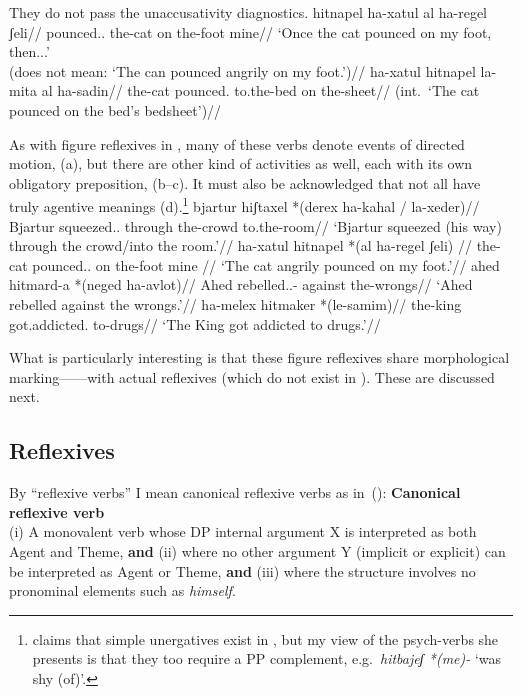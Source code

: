 They do not pass the unaccusativity diagnostics.
\ex \ljudge{\#} \begingl
		\gla hitnapel ha-xatul al ha-regel ʃeli//
		\glb pounced.. the-cat on the-foot mine//
		\glft `Once the cat pounced on my foot, then...'\\
			(does not mean: `The can pounced angrily on my foot.')//
	\endgl
\xe
\ex \ljudge{*} \begingl
	\gla ha-xatul hitnapel la-mita al ha-sadin//
	\glb the-cat pounced. to.the-bed on the-sheet//
	\glft (int.~`The cat pounced on the bed's bedsheet')//
	\endgl
\xe

As with figure reflexives in {\tnif}, many of these verbs denote events of directed motion, (\nextx a), but there are other kind of activities as well, each with its own obligatory preposition, (\nextx b--c). It must also be acknowledged that not all have truly agentive meanings (\nextx d).\footnote{\cite{siloni08} claims that simple unergatives exist in {\thit}, but my view of the psych-verbs she presents is that they too require a PP complement, e.g.~\emph{hitbajeʃ *(me)-} `was shy (of)'.}
\pex
	\a \begingl
		\gla bjartur hiʃtaxel *(derex ha-kahal / la-xeder)//
		\glb Bjartur squeezed.. through the-crowd {} to.the-room//
		\glft `Bjartur squeezed (his way) through the crowd/into the room.'//
		\endgl
	\a \begingl
		\gla ha-xatul hitnapel *(al ha-regel ʃeli) //
		\glb the-cat pounced.. on the-foot mine //
		\glft `The cat angrily pounced on my foot.'//
		\endgl
	\a \begingl
		\gla ahed hitmard-a *(neged ha-avlot)//
		\glb Ahed rebelled..- against the-wrongs//
		\glft `Ahed rebelled against the wrongs.'//
		\endgl
	\a \begingl
		\gla ha-melex hitmaker *(le-samim)//
		\glb the-king got.addicted. to-drugs//
		\glft `The King got addicted to drugs.'//
		\endgl
\xe

What is particularly interesting is that these figure reflexives share morphological marking---\thit---with actual reflexives (which do not exist in {\tnif}). These are discussed next.

	\subsection{Reflexives} \label{vz:thit:refl}
By ``reflexive verbs'' I mean canonical reflexive verbs as in~(\nextx):
\ex \textbf{Canonical reflexive verb}\\
	(i) A monovalent verb whose DP internal argument X is interpreted as both Agent and Theme, \textbf{and} (ii) where no other argument Y (implicit or explicit) can be interpreted as Agent or Theme, \textbf{and} (iii) where the structure involves no pronominal elements such as \emph{himself}.
\xe

